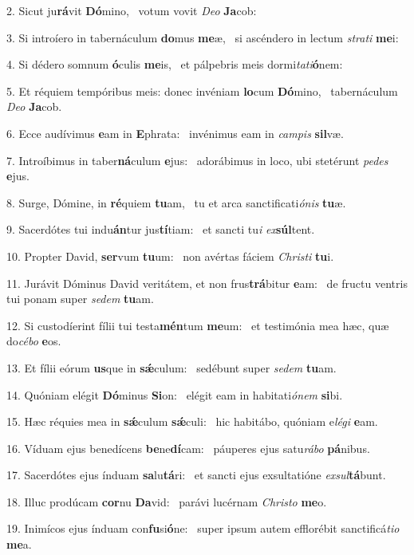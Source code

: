 2. Sicut ju\textbf{rá}vit \textbf{Dó}mino, \ast\  votum vovit \textit{De}\textit{o} \textbf{Ja}cob:\

3. Si introíero in tabernáculum \textbf{do}mus \textbf{me}æ, \ast\  si ascéndero in lectum \textit{stra}\textit{ti} \textbf{me}i:\

4. Si dédero somnum \textbf{ó}culis \textbf{me}is, \ast\  et pálpebris meis dormi\textit{ta}\textit{ti}\textbf{ó}nem:\

5. Et réquiem tempóribus meis: donec invéniam \textbf{lo}cum \textbf{Dó}mino, \ast\  tabernáculum \textit{De}\textit{o} \textbf{Ja}cob.\

6. Ecce audívimus \textbf{e}am in \textbf{E}phrata: \ast\  invénimus eam in \textit{cam}\textit{pis} \textbf{sil}væ.\

7. Introíbimus in taber\textbf{ná}culum \textbf{e}jus: \ast\  adorábimus in loco, ubi stetérunt \textit{pe}\textit{des} \textbf{e}jus.\

8. Surge, Dómine, in \textbf{ré}quiem \textbf{tu}am, \ast\  tu et arca sanctificati\textit{ó}\textit{nis} \textbf{tu}æ.\

9. Sacerdótes tui indu\textbf{án}tur jus\textbf{tí}tiam: \ast\  et sancti tu\textit{i} \textit{ex}\textbf{súl}tent.\

10. Propter David, \textbf{ser}vum \textbf{tu}um: \ast\  non avértas fáciem \textit{Chris}\textit{ti} \textbf{tu}i.\

11. Jurávit Dóminus David veritátem, et non frus\textbf{trá}bitur \textbf{e}am: \ast\  de fructu ventris tui ponam super \textit{se}\textit{dem} \textbf{tu}am.\

12. Si custodíerint fílii tui testa\textbf{mén}tum \textbf{me}um: \ast\  et testimónia mea hæc, quæ do\textit{cé}\textit{bo} \textbf{e}os.\

13. Et fílii eórum \textbf{us}que in \textbf{sǽ}culum: \ast\  sedébunt super \textit{se}\textit{dem} \textbf{tu}am.\

14. Quóniam elégit \textbf{Dó}minus \textbf{Si}on: \ast\  elégit eam in habitati\textit{ó}\textit{nem} \textbf{si}bi.\

15. Hæc réquies mea in \textbf{sǽ}culum \textbf{sǽ}culi: \ast\  hic habitábo, quóniam e\textit{lé}\textit{gi} \textbf{e}am.\

16. Víduam ejus benedícens \textbf{be}ne\textbf{dí}cam: \ast\  páuperes ejus satu\textit{rá}\textit{bo} \textbf{pá}nibus.\

17. Sacerdótes ejus índuam \textbf{sa}lu\textbf{tá}ri: \ast\  et sancti ejus exsultatióne \textit{ex}\textit{sul}\textbf{tá}bunt.\

18. Illuc prodúcam \textbf{cor}nu \textbf{Da}vid: \ast\  parávi lucérnam \textit{Chris}\textit{to} \textbf{me}o.\

19. Inimícos ejus índuam con\textbf{fu}si\textbf{ó}ne: \ast\  super ipsum autem efflorébit sanctificá\textit{ti}\textit{o} \textbf{me}a.\

